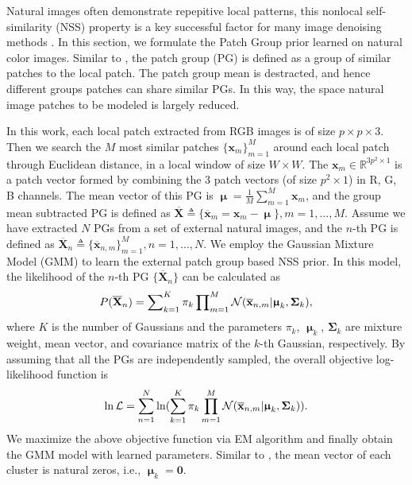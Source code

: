 \documentclass[10pt,twocolumn,letterpaper]{article}
\begin{document}
Natural images often demonstrate repepitive local patterns, this nonlocal self-similarity (NSS) property is a key successful factor for many image denoising methods \cite{nlm,bm3d,lssc,ncsr,wnnm,pgpd}. In this section, we formulate the Patch Group prior learned on natural color images. Similar to \cite{pgpd}, the patch group (PG) is defined as a group of similar patches to the local patch. The patch group mean is destracted, and hence different groups patches can share similar PGs. In this way, the space natural image patches to be modeled is largely reduced. 

In this work, each local patch extracted from RGB images is of size $p\times p \times 3$. Then we search the $M$ most similar patches $\{\mathbf{x}_{m}\}_{m=1}^{M}$ around each local patch through Euclidean distance, in a local window of size $W\times W$. The $\mathbf{x}_{m}\in \mathbb{R}^{3p^{2}\times1}$ is a patch vector formed by combining the 3 patch vectors (of size $p^{2}\times 1$) in R, G, B channels. The mean vector of this PG is $\boldsymbol{\upmu}=\frac{1}{M}\sum_{m=1}^{M}\mathbf{x}_{m}$, and the group mean subtracted PG is defined as $\mathbf{\overline{X}}\triangleq \{\mathbf{\overline{x}}_{m}=\mathbf{x}_{m}-\boldsymbol{\upmu}\}, m=1,...,M$. Assume we have extracted $N$ PGs from a set of external natural images, and the $n$-th PG is defined as $\mathbf{\overline{X}}_{n}\triangleq \{\mathbf{\overline{x}}_{n,m}\}_{m=1}^{M}, n=1,...,N$. We employ the Gaussian Mixture Model (GMM) to learn the external patch group based NSS prior. In this model, the likelihood of the $n$-th PG $\{\mathbf{\overline{X}}_{n}\}$ can be calculated as
\vspace{-2mm}
\begin{equation}\label{equ1}\vspace{-2mm}
P(\mathbf{\overline{X}}_{n})  = \sum\nolimits_{k=1}^{K}\pi_{k}\prod\nolimits_{m=1}^{M}\mathcal{N}(\mathbf{\overline{x}}_{n,m}|\boldsymbol{\upmu}_{k},\mathbf{\Sigma}_{k}),
\end{equation}
where $K$ is the number of Gaussians and the parameters $\pi_{k}$, $\boldsymbol{\upmu}_{k}$, $\mathbf{\Sigma}_{k}$ are mixture weight, mean vector, and covariance matrix of the $k$-th Gaussian, respectively. By assuming that all the PGs are independently sampled, the overall objective log-likelihood function is
\vspace{-2mm}
\begin{equation}\label{equ2}\vspace{-2mm}
\begin{split}
\ln\mathcal{L}=\sum_{n=1}^{N} \ln(\sum_{k=1}^{K}\pi_{k}\prod_{m=1}^{M}\mathcal{N}(\mathbf{\overline{x}}_{n,m}|\boldsymbol{\upmu}_{k},\mathbf{\Sigma}_{k})).
\end{split}
\end{equation} 
We maximize the above objective function via EM algorithm \cite{em} and finally obtain the GMM model with learned parameters. Similar to \cite{pgpd}, the mean vector of each cluster is natural zeros, i.e., $\boldsymbol{\upmu}_{k}=\mathbf{0}$.
\end{document}
